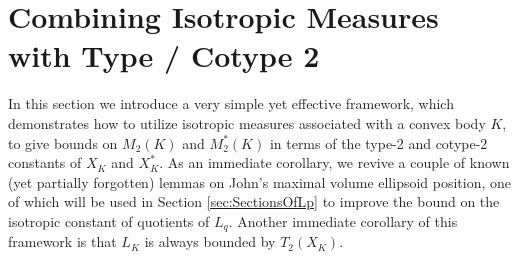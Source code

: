 \documentclass[12pt,oneside]{amsart}
\theoremstyle{definition}
\theoremstyle{remark}
\theoremstyle{proof}
\numberwithin{equation}{section}
\begin{document}


\section{Combining Isotropic Measures with Type / Cotype 2}
\label{sec:type-2}

In this section we introduce a very simple yet effective
framework, which demonstrates how to utilize isotropic measures
associated with a convex body $K$, to give bounds on $M_2(K)$ and
$M^*_2(K)$ in terms of the type-2 and cotype-2 constants of $X_K$
and $X^*_K$. As an immediate corollary, we revive a couple of
known (yet partially forgotten) lemmas on John's maximal volume
ellipsoid position, one of which will be used in Section
\ref{sec:SectionsOfLp} to improve the bound on the isotropic
constant of quotients of $L_q$. Another immediate corollary of
this framework is that $L_K$ is always bounded by $T_2(X_K)$.

\medskip
\end{document}
